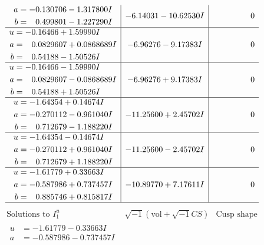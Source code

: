 \documentclass[1p]{elsarticle_modified}
\theoremstyle{definition}
\newcommand{\I}{\sqrt{-1}}
\begin{document}
$$\begin{array}{c|c|c}
\begin{aligned}
a &= -0.130706 - 1.317800 I \\
b &= \phantom{-}0.499801 - 1.227290 I\end{aligned}
 & -6.14031 - 10.62530 I & \phantom{-0.000000 } 0 \\ \hline\begin{aligned}
u &= -0.16466 + 1.59990 I \\
a &= \phantom{-}0.0829607 + 0.0868689 I \\
b &= \phantom{-}0.54188 - 1.50526 I\end{aligned}
 & -6.96276 - 9.17383 I & \phantom{-0.000000 } 0 \\ \hline\begin{aligned}
u &= -0.16466 - 1.59990 I \\
a &= \phantom{-}0.0829607 - 0.0868689 I \\
b &= \phantom{-}0.54188 + 1.50526 I\end{aligned}
 & -6.96276 + 9.17383 I & \phantom{-0.000000 } 0 \\ \hline\begin{aligned}
u &= -1.64354 + 0.14674 I \\
a &= -0.270112 - 0.961040 I \\
b &= \phantom{-}0.712679 - 1.188220 I\end{aligned}
 & -11.25600 + 2.45702 I & \phantom{-0.000000 } 0 \\ \hline\begin{aligned}
u &= -1.64354 - 0.14674 I \\
a &= -0.270112 + 0.961040 I \\
b &= \phantom{-}0.712679 + 1.188220 I\end{aligned}
 & -11.25600 - 2.45702 I & \phantom{-0.000000 } 0 \\ \hline\begin{aligned}
u &= -1.61779 + 0.33663 I \\
a &= -0.587986 + 0.737457 I \\
b &= \phantom{-}0.885746 + 0.815817 I\end{aligned}
 & -10.89770 + 7.17611 I & \phantom{-0.000000 } 0\\
 \hline 
 \end{array}$$\newpage$$\begin{array}{c|c|c}  
\text{Solutions to }I^u_{1}& \I (\text{vol} + \sqrt{-1}CS) & \text{Cusp shape}\\
 \hline 
\begin{aligned}
u &= -1.61779 - 0.33663 I \\
a &= -0.587986 - 0.737457 I \\

\end{aligned}
\end{array}$$
\end{document}
